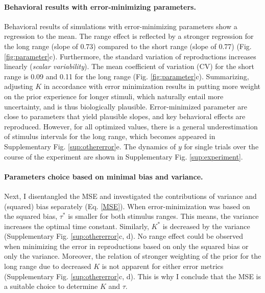 \documentclass[10pt, a4paper]{article}
\begin{document}
\paragraph{Behavioral results with error-minimizing parameters.}
Behavioral results of simulations with error-minimizing parameters show a regression to the mean. The range effect is reflected by a stronger regression for the long range (slope of 0.73) compared to the short range (slope of 0.77) (Fig. \ref{fig:parameter}c). 
Furthermore, the standard variation of reproductions increases linearly (\textit{scalar variability}). The mean coefficient of variation (CV) for the short range is 0.09 and 0.11 for the long range (Fig. \ref{fig:parameter}c).
Summarizing, adjusting $K$ in accordance with error minimization results in putting more weight on the prior experience for longer stimuli, which naturally entail more uncertainty, and is thus biologically plausible.
Error-minimized parameter are close to parameters that yield plausible slopes, and key behavioral effects are reproduced.
However, for all optimized values, there is a general underestimation of stimulus intervals for the long range, which becomes appeared in Supplementary Fig. \ref{sup:othererror}e.
The dynamics of $y$ for single trials over the course of the experiment are shown in Supplementary Fig. \ref{sup:experiment}.

\paragraph{Parameters choice based on minimal bias and variance.}
Next, I disentangled the MSE and investigated the contributions of variance and (squared) bias separately (Eq. \ref{MSE}).
When error-minimization was based on the squared bias, $\tau^*$ is smaller for both stimulus ranges.
This means, the variance increases the optimal time constant. %
Similarly, $K^*$ is decreased by the variance (Supplementary Fig. \ref{sup:othererror}c, d).
No range effect could be observed when minimizing the error in reproductions based on only the squared bias or only the variance. 
Moreover, the relation of stronger weighting of the prior for the long range due to decreased $K$ is not apparent for either error metrics (Supplementary Fig. \ref{sup:othererror}c, d).
This is why I conclude that the MSE is a suitable choice to determine $K$ and $\tau$.
\end{document}
